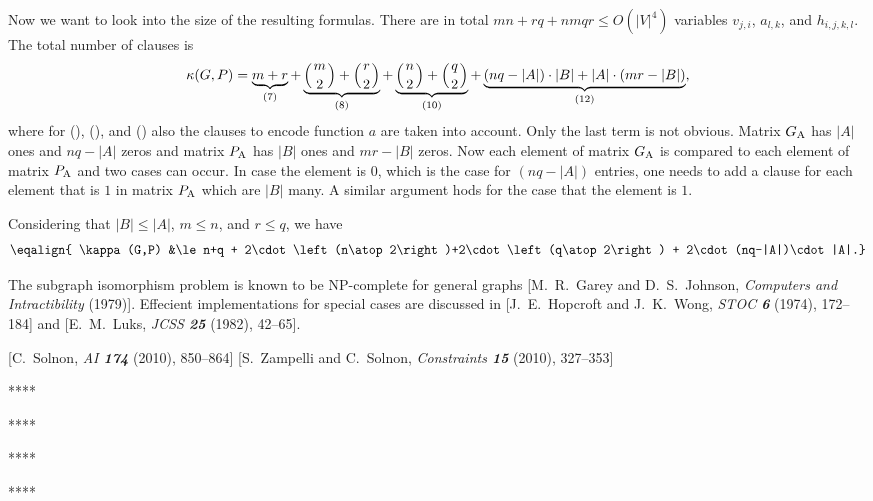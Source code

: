 \medskip{}  Now we want to look
into the size of the resulting formulas.  There are in total $mn+rq+nmqr\le
O(|V|^4)$ variables $v_{j,i}$, $a_{l,k}$, and $h_{i,j,k,l}$.  The total number
of clauses is
$$
  \kappa(G,P)=
  \underbrace{m+r}_{(7)}
  + \underbrace{\left(m\atop 2\right)+\left(r\atop 2\right)}_{(8)}
  + \underbrace{\left(n\atop 2\right)+\left(q\atop 2\right)}_{(10)}
  + \underbrace{(nq-|A|)\cdot|B|+|A|\cdot(mr-|B|)}_{(12)},
$$
where for (\eqonehota), (\eqonehotb), and (\eqonehotc) also the clauses to
encode function $a$ are taken into account.  Only the last term is not obvious.
Matrix $G_{\rm A}$ has $|A|$ ones and $nq-|A|$ zeros and matrix $P_{\rm A}$ has
$|B|$ ones and $mr-|B|$ zeros.  Now each element of matrix $G_{\rm A}$ is
compared to each element of matrix $P_{\rm A}$ and two cases can occur. In case
the element is $0$, which is the case for $(nq-|A|)$ entries, one needs to add a
clause for each element that is $1$ in matrix $P_{\rm A}$ which are $|B|$ many.
A similar argument hods for the case that the element is $1$.

Considering that $|B|\le |A|$, $m\le n$, and $r\le q$, we have
$$
  \eqalign{
  \kappa(G,P) &\le
  n+q
  + 2\cdot\left(n\atop 2\right)+2\cdot\left(q\atop 2\right)
  + 2\cdot (nq-|A|)\cdot |A|.}
$$

\medskip{}


\medskip{}  The subgraph isomorphism problem is
known to be NP-complete for general graphs [M.\ R.\ Garey and D.\ S.\ Johnson,
{\sl Computers and Intractibility} (1979)].  Effecient implementations for
special cases are discussed in [J.\ E.\ Hopcroft and J.\ K.\ Wong, {\sl STOC\/
\bf 6} (1974), 172--184] and [E.\ M.\ Luks, {\sl JCSS\/ \bf 25} (1982), 42--65].

[C.\ Solnon, {\sl AI\/ \bf 174} (2010), 850--864]  [S.\ Zampelli and C.\ Solnon, {\sl Constraints\/ \bf 15} (2010), 327--353]

\centerline{****}


\centerline{****}


\centerline{****}


\centerline{****}


